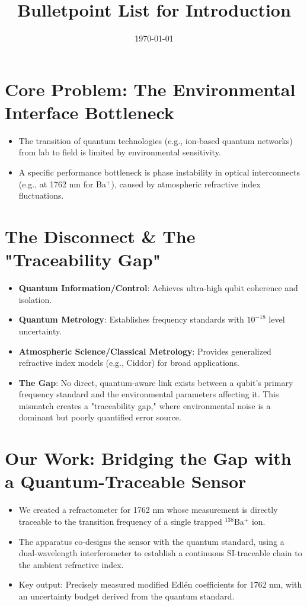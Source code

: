 \documentclass[aip,reprint,groupedaddress,onecolumn,superscriptaddress]{revtex4-2}
\begin{document}
\title{Bulletpoint List for Introduction}
\date{\today}

\maketitle

\section{Core Problem: The Environmental Interface Bottleneck}
\begin{itemize}
    \item The transition of quantum technologies (e.g., ion-based quantum networks) from lab to field is limited by environmental sensitivity.
    \item A specific performance bottleneck is phase instability in optical interconnects (e.g., at 1762 nm for Ba$^+$), caused by atmospheric refractive index fluctuations.
\end{itemize}

\section{The Disconnect \& The "Traceability Gap"}
\begin{itemize}
    \item \textbf{Quantum Information/Control}: Achieves ultra-high qubit coherence and isolation.
    \item \textbf{Quantum Metrology}: Establishes frequency standards with $10^{-18}$ level uncertainty.
    \item \textbf{Atmospheric Science/Classical Metrology}: Provides generalized refractive index models (e.g., Ciddor) for broad applications.
    \item \textbf{The Gap}: No direct, quantum-aware link exists between a qubit's primary frequency standard and the environmental parameters affecting it. This mismatch creates a "traceability gap," where environmental noise is a dominant but poorly quantified error source.
\end{itemize}

\section{Our Work: Bridging the Gap with a Quantum-Traceable Sensor}
\begin{itemize}
    \item We created a refractometer for 1762 nm whose measurement is directly traceable to the transition frequency of a single trapped $^{138}$Ba$^+$ ion.
    \item The apparatus co-designs the sensor with the quantum standard, using a dual-wavelength interferometer to establish a continuous SI-traceable chain to the ambient refractive index.
    \item Key output: Precisely measured modified Edlén coefficients for 1762 nm, with an uncertainty budget derived from the quantum standard.
\end{itemize}
\end{document}
